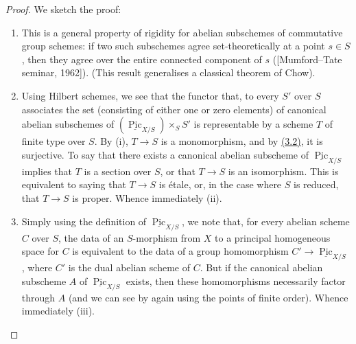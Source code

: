 \documentclass{article}
\providecommand{\tightlist}{%
  \setlength{\itemsep}{0pt}\setlength{\parskip}{0pt}}
\theoremstyle{definition}
\theoremstyle{definition}
\theoremstyle{definition}
\theoremstyle{definition}
\theoremstyle{remark}
\begin{document}
\begin{proof}

We sketch the proof:

\begin{enumerate}
\def\labelenumi{\roman{enumi}.}
\tightlist
\item
  This is a general property of rigidity for abelian subschemes of commutative group schemes: if two such subschemes agree set-theoretically at a point \(s\in S\), then they agree over the entire connected component of \(s\) ({[}Mumford--Tate seminar, 1962{]}).
  (This result generalises a classical theorem of Chow).
\item
  Using Hilbert schemes, we see that the functor that, to every \(S'\) over \(S\) associates the set (consisting of either one or zero elements) of canonical abelian subschemes of \((\underline{\operatorname{Pic}}_{X/S})\times_S S'\) is representable by a scheme \(T\) of finite type over \(S\).
  By (i), \(T\to S\) is a monomorphism, and by \protect\hyperlink{fga-3-vi-corollary-3.2}{(3.2)}, it is surjective.
  To say that there exists a canonical abelian subscheme of \(\underline{\operatorname{Pic}}_{X/S}\) implies that \(T\) is a section over \(S\), or that \(T\to S\) is an isomorphism.
  This is equivalent to saying that \(T\to S\) is étale, or, in the case where \(S\) is reduced, that \(T\to S\) is proper.
  Whence immediately (ii).
\item
  Simply using the definition of \(\underline{\operatorname{Pic}}_{X/S}\), we note that, for every abelian scheme \(C\) over \(S\), the data of an \(S\)-morphism from \(X\) to a principal homogeneous space for \(C\) is equivalent to the data of a group homomorphism \(C'\to\underline{\operatorname{Pic}}_{X/S}\), where \(C'\) is the dual abelian scheme of \(C\).
  But if the canonical abelian subscheme \(A\) of \(\underline{\operatorname{Pic}}_{X/S}\) exists, then these homomorphisms necessarily factor through \(A\) (and we can see by again using the points of finite order).
  Whence immediately (iii).
\end{enumerate}

\end{proof}
\end{document}
